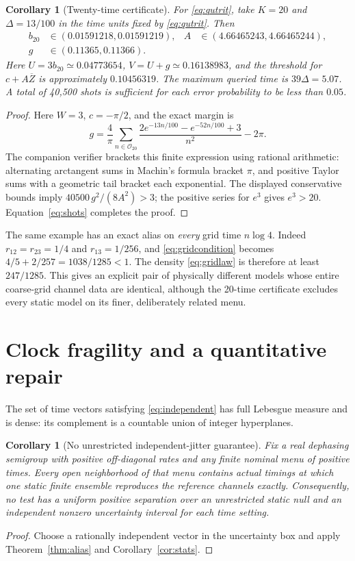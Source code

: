\documentclass[11pt,a4paper]{article}
\newtheorem{corollary}[theorem]{Corollary}
\theoremstyle{remark}\newtheorem{remark}[theorem]{Remark}
\begin{document}
\begin{corollary}[Twenty-time certificate]\label{cor:20}
For \eqref{eq:qutrit}, take $K=20$ and $\Delta=13/100$ in the time
units fixed by \eqref{eq:qutrit}. Then
\begin{align*}
 b_{20}&\in(0.01591218,0.01591219),&
 A&\in(4.66465243,4.66465244),\\
 g&\in(0.11365,0.11366).&&
\end{align*}
Here $U=3b_{20}\simeq0.04773654$, $V=U+g\simeq0.16138983$,
and the threshold for $c+A\overline Z$ is approximately $0.10456319$.
The maximum queried time is $39\Delta=5.07$. A total of 40,500 shots
is sufficient for each error probability to be less than $0.05$.
\end{corollary}
\begin{proof}
Here $W=3$, $c=-\pi/2$, and the exact margin is
\begin{equation}\label{eq:qmargin}
 g=\frac4\pi\sum_{n\in\mathcal O_{20}}
       \frac{2e^{-13n/100}-e^{-52n/100}+3}{n^2}-2\pi.
\end{equation}
The companion verifier brackets this finite expression using rational
arithmetic: alternating arctangent sums in Machin's formula bracket
$\pi$, and positive Taylor sums with a geometric tail bracket each
exponential. The displayed conservative bounds imply
$40500\,g^2/(8A^2)>3$; the positive series for $e^3$ gives $e^3>20$.
Equation~\eqref{eq:shots} completes the proof.
\end{proof}

The same example has an exact alias on \emph{every} grid time
$n\log4$. Indeed $r_{12}=r_{23}=1/4$ and $r_{13}=1/256$, and
\eqref{eq:gridcondition} becomes
$4/5+2/257=1038/1285<1$.
The density \eqref{eq:gridlaw} is therefore at least $247/1285$.
This gives an explicit pair of physically different models whose entire
coarse-grid channel data are identical, although the 20-time certificate
excludes every static model on its finer, deliberately related menu.

\section{Clock fragility and a quantitative repair}\label{sec:clock}
The set of time vectors satisfying \eqref{eq:independent} has full
Lebesgue measure and is dense: its complement is a countable union of
integer hyperplanes.

\begin{corollary}[No unrestricted independent-jitter guarantee]
\label{cor:jitter}
Fix a real dephasing semigroup with positive off-diagonal rates and any
finite nominal menu of positive times. Every open neighborhood of that
menu contains actual timings at which one static finite ensemble
reproduces the reference channels exactly. Consequently, no test has a
uniform positive separation over an unrestricted static null and an
independent nonzero uncertainty interval for each time setting.
\end{corollary}
\begin{proof}
Choose a rationally independent vector in the uncertainty box and apply
Theorem~\ref{thm:alias} and Corollary~\ref{cor:stats}.
\end{proof}
\end{document}
